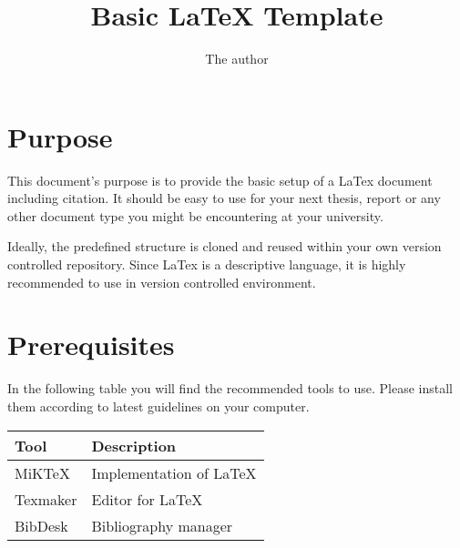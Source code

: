 \documentclass[10pt,a4paper,oneside]{article}
\title{Basic LaTeX Template}
\author{The author}
\begin{document}
\maketitle
\section{Purpose}
This document's purpose is to provide the basic setup of a LaTex document including citation. It should be easy to use for your next thesis, report or any other document type you might be encountering at your university.

Ideally, the predefined structure is cloned and reused within your own version controlled repository. Since LaTex is a descriptive language, it is highly recommended to use in version controlled environment.

\section{Prerequisites}
In the following table you will find the recommended tools to use. Please install them according to latest guidelines on your computer.

\begin{tabular}{|l|l|}
\hline 
Tool & Description \\ 
\hline 
\hline
MiKTeX & Implementation of LaTeX \\ 
\hline 
Texmaker & Editor for LaTeX \\ 
\hline 
BibDesk \cite{url:BibDesk} & Bibliography manager \\ 
\hline 
\end{tabular} 


\end{document}
